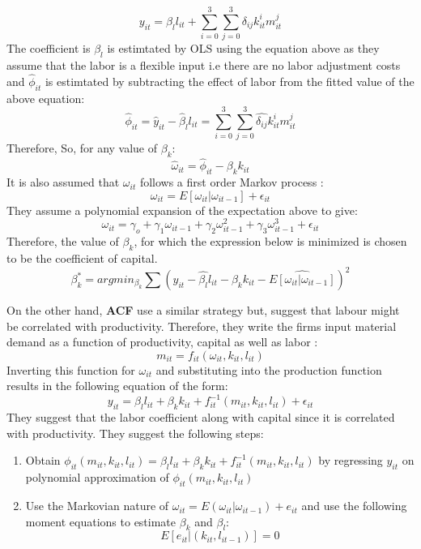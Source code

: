\documentclass[12pt]{article}
\begin{document}
$$  y_{it} =  \beta_{l}l_{it} + \sum_{i=0}^{3} \sum_{j=0}^{3}
\delta_{ij}k_{it}^{i}m_{it}^{j}$$
The coefficient is $\beta_{l}$ is estimtated by OLS using the equation
above as they assume that the labor is a flexible input i.e there are
no labor adjustment costs and $\hat{\phi}_{it}$ is estimtated by
subtracting the effect of labor from
the fitted value of the above equation:
$$ \hat{\phi}_{it} = \hat{y}_{it} - \hat{\beta}_{l}l_{it} =
 \sum_{i=0}^{3} \sum_{j=0}^{3}
\hat{\delta_{ij}}k_{it}^{i}m_{it}^{j}$$
Therefore, 
So, for any value of $\beta_{k}$:
$$\hat{\omega}_{it} = \hat{\phi}_{it} - \beta_{k}k_{it}$$
 It is also assumed that $\omega_{it}$ follows a first order Markov
process : 
$$\omega_{it} = E[\omega_{it}|\omega_{it-1}] + \epsilon_{it}$$
They  assume a polynomial expansion of the expectation above to give:
$$ \omega_{it}=  \gamma_{o}+\gamma_{1}\omega_{it-1} +
\gamma_{2}\omega_{it-1}^2 + \gamma_{3}\omega_{it-1}^3 + \epsilon_{it} $$ 
Therefore, the value of $\beta_{k}$, for which the expression below is
minimized is chosen to be the coefficient of capital.  
\begin{equation}
\beta_{k}^{*} = arg min_{\beta_{k}}\sum (y_{it} - \hat{\beta_{l}}l_{it} -
\beta_{k}k_{it} - \hat{E[\omega_{it}|\omega_{it-1}]})^2 
\end{equation}

On the other hand, \textcite{ackerberg2006structural}\textbf{ACF} use a
similar strategy but, suggest that labour might be
correlated with productivity. Therefore, they write  the firms input
material demand as a function of productivity, capital as well as
labor : 
$$ m_{it} = f_{it}(\omega_{it}, k_{it}, l_{it})$$
Inverting this function for $\omega_{it}$ and substituting into the
production function results in the following 
equation of the form:
\begin{equation}
y_{it} = \beta_{l}l_{it} + \beta_k k_{it} + f_{it}^{-1}(m_{it},
k_{it}, l_{it})+ \epsilon_{it}
\end{equation}
They suggest that the  labor coefficient along with capital since it is correlated with
productivity. 
They suggest the following steps:
\begin{enumerate}
\item Obtain $\phi_{it}(m_{it}, k_{it}, l_{it}) = \beta_{l}l_{it} + \beta_k k_{it} + f_{it}^{-1}(m_{it},
k_{it}, l_{it})$ by regressing $y_{it}$ on polynomial approximation of
$\phi_{it}(m_{it}, k_{it}, l_{it})$
\item Use the Markovian nature of $\omega_{it} =
  E(\omega_{it}|\omega_{it-1}) + e_{it}$
and use the following moment equations to estimate $\beta_{k}$ and
$\beta_{l}$:
\begin{equation}
E[e_{it}|(k_{it}, l_{it-1})]= 0
\end{equation}
\end{enumerate} 
\end{document}
